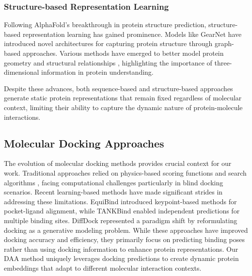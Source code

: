 \subsubsection{Structure-based Representation Learning}
Following AlphaFold's \cite{jumper2021highly} breakthrough in protein structure prediction, structure-based representation learning has gained prominence. Models like GearNet \cite{zhang2023protein} have introduced novel architectures for capturing protein structure through graph-based approaches. Various methods have emerged to better model protein geometry and structural relationships \cite{fan2023continuous, hermosilla2020intrinsic, jing2020learning}, highlighting the importance of three-dimensional information in protein understanding.

Despite these advances, both sequence-based and structure-based approaches generate static protein representations that remain fixed regardless of molecular context, limiting their ability to capture the dynamic nature of protein-molecule interactions.

\subsection{Molecular Docking Approaches}
The evolution of molecular docking methods provides crucial context for our work. Traditional approaches relied on physics-based scoring functions and search algorithms \cite{McNutt2021,Stark2022}, facing computational challenges particularly in blind docking scenarios. Recent learning-based methods have made significant strides in addressing these limitations. EquiBind \cite{stark2022equibind} introduced keypoint-based methods for pocket-ligand alignment, while TANKBind \cite{lu2022tankbind} enabled independent predictions for multiple binding sites. DiffDock \cite{DiffDock2023} represented a paradigm shift by reformulating docking as a generative modeling problem. While these approaches have improved docking accuracy and efficiency, they primarily focus on predicting binding poses rather than using docking information to enhance protein representations. Our DAA method uniquely leverages docking predictions to create dynamic protein embeddings that adapt to different molecular interaction contexts.





